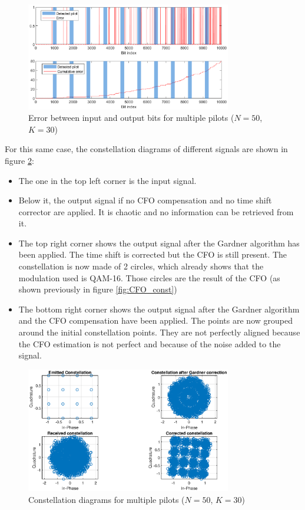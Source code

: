 \documentclass[10pt,a4paper]{ULBreport}
\begin{document}
\begin{figure}[H]
    \centering
    \includegraphics[width=0.8\textwidth]{pic/full_1.eps}
    \caption{Error between input and output bits for multiple pilots ($N=50$, $K=30$)}
    \label{fig:full_1}
\end{figure}

For this same case, the constellation diagrams of different signals are shown in figure \ref{fig:full_2}: 
\begin{itemize}
    \item The one in the top left corner is the input signal. 
    \item Below it, the output signal if no CFO compensation and no time shift corrector are applied. It is chaotic and no information can be retrieved from it.
    \item The top right corner shows the output signal after the Gardner algorithm has been applied. The time shift is corrected but the CFO is still present. The constellation is now made of 2 circles, which already shows that the modulation used is QAM-16. Those circles are the result of the CFO (as shown previously in figure \ref{fig:CFO_const})
    \item The bottom right corner shows the output signal after the Gardner algorithm and the CFO compensation have been applied. The points are now grouped around the initial constellation points. They are not perfectly aligned because the CFO estimation is not perfect and because of the noise added to the signal.
\end{itemize}

\begin{figure}[H]
    \centering
    \includegraphics[width=0.8\textwidth]{pic/full_2.eps}
    \caption{Constellation diagrams for multiple pilots ($N=50$, $K=30$)}
    \label{fig:full_2}
\end{figure}
\end{document}
